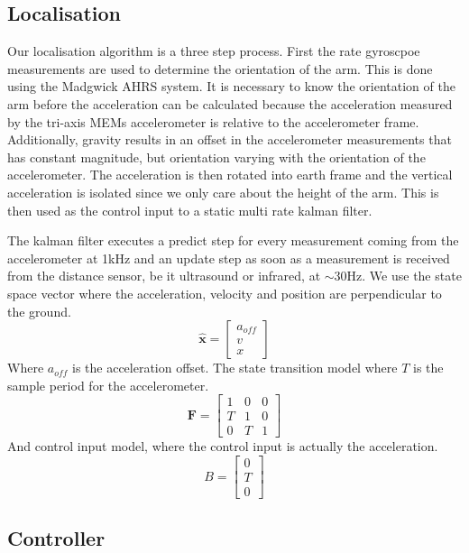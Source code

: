 \subsection{Localisation}
Our localisation algorithm is a three step process. First the rate gyroscpoe measurements are used to determine the orientation of
the arm. This is done using the Madgwick AHRS system\cite{Madgwick2011}. It is necessary to know the orientation of the arm before
the acceleration can be calculated because the acceleration measured by the tri-axis MEMs accelerometer is relative to the 
accelerometer frame. Additionally, gravity results in an offset in the accelerometer measurements that has constant magnitude, but
orientation varying with the orientation of the accelerometer. The acceleration is then rotated into earth frame and the vertical
acceleration is isolated since we only care about the height of the arm.
This is then used as the control input to a static multi rate kalman filter.

The kalman filter executes a predict step for every measurement coming from the accelerometer at 1kHz and an update step as soon 
as a measurement is received from the distance sensor, be it ultrasound or infrared, at \(\sim\)30Hz. We use the state space 
vector where the acceleration, velocity and position are perpendicular to the ground.
\begin{equation*}
	\hat{\mathbf{x}} = \begin{bmatrix}
		a_{off} \\
		v \\
		x
	\end{bmatrix}
\end{equation*}
Where \(a_{off}\) is the acceleration offset.
The state transition model where \(T\) is the sample period for the accelerometer.
\begin{equation*}
	\mathbf{F} = \begin{bmatrix}
		1 & 0 & 0 \\
		T & 1 & 0 \\
		0 & T & 1 
	\end{bmatrix}
\end{equation*}
And control input model, where the control input is actually the acceleration.
\begin{equation*}
	B = \begin{bmatrix}
		0 \\
		T \\
		0 
	\end{bmatrix}
\end{equation*}

\subsection{Controller}
